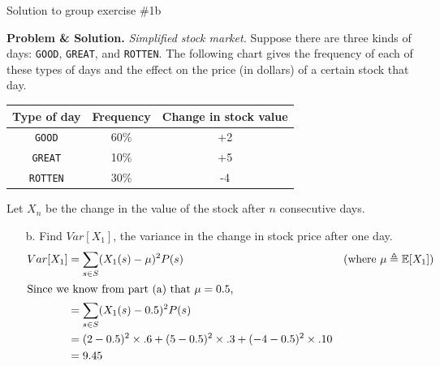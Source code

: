 \documentclass[10pt]{beamer}
\begin{document}
\begin{frame}{Solution to group exercise \#1b}
\footnotesize 

\textbf{Problem \& Solution.} \textit{Simplified stock market.} Suppose there are three kinds of days: \texttt{GOOD}, \texttt{GREAT}, and \texttt{ROTTEN}. The following chart gives the frequency of each of these types of days and the effect on the price (in dollars) of a certain stock that day.
	\vspace{-.2cm}
	\begin{table}[H]
	\begin{tabular}{|c|c|c|}
	\toprule 
	\colorbox{blue!30}{Type of day} & 	\colorbox{blue!30}{Frequency} & \colorbox{blue!30}{Change in stock value} \\
	\midrule 
	\texttt{GOOD} & 60\% & +2 \\
	\texttt{GREAT} & 10\% & +5 \\
	\texttt{ROTTEN} & 30\% & -4 \\
	\bottomrule 
	\end{tabular}
	\end{table}
	\vspace{-.2cm}
	Let $X_n$ be the change in the value of the stock after $n$ consecutive days.
		\vspace{-.2cm}
	 \begin{itemize} \footnotesize 
	\item[b.] Find  $Var[X_1]$, the variance in the change in stock price after one day.
	\begin{align*}
	 Var[X_1] &= \sum_{s \in S} (X_1(s)-\mu)^2 P(s)  && \text{(where $\mu \triangleq \mathbb{E}[X_1]$)} \\
	 \intertext{Since we know from part (a) that $\mu=0.5$,}
	 &= \sum_{s \in S} (X_1(s)-0.5)^2 P(s) \\
	 &= (2 - 0.5)^2 \times .6 + 	(5-0.5)^2 \times .3 + (-4-0.5)^2 \times .10 \\
	 &= 9.45
	\end{align*}
	\end{itemize}
\end{frame}
\end{document}
